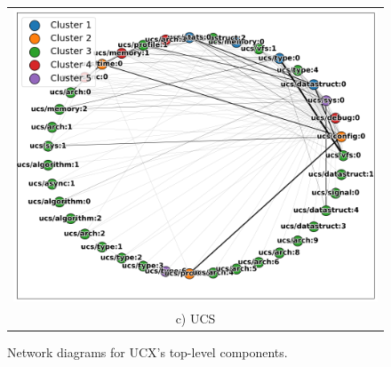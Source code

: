 \begin{figure}[Ht]
\begin{tabular}{c}
        \includegraphics[width=0.96\linewidth]{figures/ucx_analysis/ucs.png} \\
        c) UCS \\
    \end{tabular}
    \caption{Network diagrams for UCX's top-level components.}
    \label{fig:ucx_components}
\end{figure}